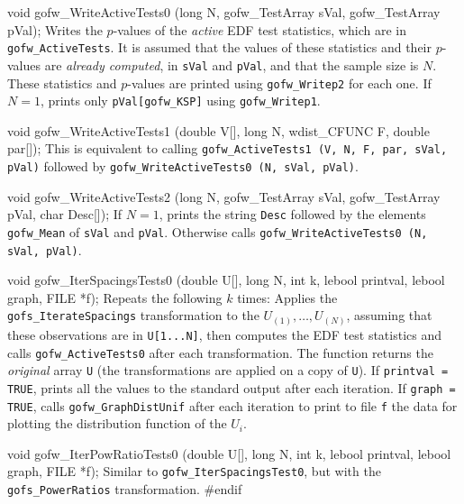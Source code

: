 void gofw_WriteActiveTests0 (long N, gofw_TestArray sVal,
                                     gofw_TestArray pVal);
\endcode
\tab  Writes the $p$-values of the {\em active\/} EDF test statistics,
  which are in {\tt gofw\_ActiveTests}.  It is assumed that the values 
  of these statistics and their $p$-values are {\em already computed}, 
  in {\tt sVal} and {\tt pVal}, and that the sample size is $N$.
  These statistics and $p$-values are printed
  using {\tt gofw\_Writep2} for each one.
  If $N=1$, prints only {\tt pVal[gofw\_KSP]} using {\tt gofw\_Writep1}.
\endtab
\code


void gofw_WriteActiveTests1 (double V[], long N, 
                             wdist_CFUNC F, double par[]);
\endcode
\tab This is equivalent to calling 
 {\tt gofw\_ActiveTests1 (V, N, F, par, sVal, pVal)} followed by
 {\tt gofw\_WriteActiveTests0 (N, sVal, pVal)}.
\endtab
\code


void gofw_WriteActiveTests2 (long N, gofw_TestArray sVal,
                             gofw_TestArray pVal, char Desc[]);
\endcode
\tab If $N=1$, prints the string {\tt Desc} followed by the elements
  {\tt gofw\_Mean} of {\tt sVal} and {\tt pVal}. Otherwise calls
  {\tt gofw\_WriteActiveTests0 (N, sVal, pVal)}.
\endtab
\code


void gofw_IterSpacingsTests0 (double U[], long N, int k, 
                              lebool printval, lebool graph, FILE *f);
\endcode
\tab Repeats the following $k$ times:
  Applies the {\tt gofs\_IterateSpacings} transformation to the
  $U_{(1)},\dots,U_{(N)}$, assuming that these observations are in 
  {\tt U[1...N]}, then computes the EDF test statistics and calls
  {\tt gofw\_ActiveTests0} after each transformation.
  The function returns the {\em original\/} array {\tt U} (the
  transformations are applied on a copy of {\tt U}).
  If {\tt printval = TRUE}, prints all the values to the standard output
  after each iteration.
  If {\tt graph = TRUE}, calls {\tt gofw\_GraphDistUnif} after each iteration
  to print to file {\tt f} the data for plotting the distribution
  function of the $U_i$. 
\endtab
\code


void gofw_IterPowRatioTests0 (double U[], long N, int k,
                              lebool printval, lebool graph, FILE *f);
\endcode
\tab  Similar to {\tt gofw\_IterSpacingsTest0}, but with the
  {\tt gofs\_PowerRatios} transformation.
\endtab
\code
\hide
#endif
\endhide
\endcode


